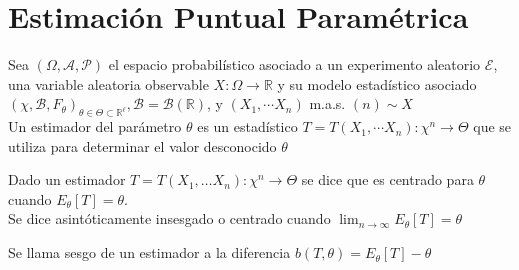 \section{Estimación Puntual Paramétrica}

\begin{definición}[Estimador]
  Sea $(\Omega, \mathcal{A}, \mathcal{P})$ el espacio probabilístico asociado a un experimento aleatorio $\mathcal{E}$, una variable aleatoria observable $X: \Omega \longrightarrow \mathbb{R}$ y su modelo estadístico asociado $\left(\chi, \mathcal{B}, F_{\theta}\right)_{\theta \in \Theta \subset \mathbb{R}^{\ell}}, \mathcal{B}=\mathcal{B}(\mathbb{R})$, y $\left(X_{1}, \cdots X_{n}\right)$ m.a.s. $(n) \sim X$
  \\Un estimador del parámetro $\theta$ es un estadístico $T=T\left(X_{1}, \cdots X_{n}\right): \chi^{n} \longrightarrow \Theta$ que se utiliza para determinar el valor desconocido $\theta$
\end{definición}

\begin{definición}
  Dado un estimador $T = T(X_1, \ldots X_n): \chi^{n} \to \Theta$ se dice que es centrado para $\theta$ cuando $E_{\theta}[T] = \theta$. \\
  Se dice asintóticamente insesgado o centrado cuando $\lim_{n \to \infty}E_{\theta}[T] = \theta$
\end{definición}

\begin{definición}[Sesgo]
  Se llama sesgo de un estimador a la diferencia $b(T, \theta) = E_{\theta}[T] - \theta$
\end{definición}


